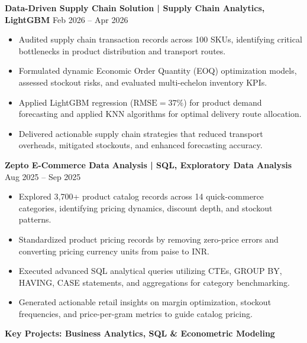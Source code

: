 \documentclass[10pt]{article}
\begin{document}
\vspace{6pt}

\textbf{Data-Driven Supply Chain Solution | Supply Chain Analytics, LightGBM} \hfill Feb 2026 -- Apr 2026
\begin{itemize}[noitemsep, topsep=2pt, partopsep=0pt, parsep=1.5pt]
    \item Audited supply chain transaction records across 100 SKUs, identifying critical bottlenecks in product distribution and transport routes.
    \item Formulated dynamic Economic Order Quantity (EOQ) optimization models, assessed stockout risks, and evaluated multi-echelon inventory KPIs.
    \item Applied LightGBM regression ($\text{RMSE} = 37\%$) for product demand forecasting and applied KNN algorithms for optimal delivery route allocation.
    \item Delivered actionable supply chain strategies that reduced transport overheads, mitigated stockouts, and enhanced forecasting accuracy.
\end{itemize}

\vspace{6pt}

\textbf{Zepto E-Commerce Data Analysis | SQL, Exploratory Data Analysis} \hfill Aug 2025 -- Sep 2025
\begin{itemize}[noitemsep, topsep=2pt, partopsep=0pt, parsep=1.5pt]
    \item Explored 3,700+ product catalog records across 14 quick-commerce categories, identifying pricing dynamics, discount depth, and stockout patterns.
    \item Standardized product pricing records by removing zero-price errors and converting pricing currency units from paise to INR.
    \item Executed advanced SQL analytical queries utilizing CTEs, GROUP BY, HAVING, CASE statements, and aggregations for category benchmarking.
    \item Generated actionable retail insights on margin optimization, stockout frequencies, and price-per-gram metrics to guide catalog pricing.
\end{itemize}

\newpage

\begin{center}
    \textbf{Key Projects: Business Analytics, SQL \& Econometric Modeling}
\end{center}
\vspace{-4pt}
\end{document}
